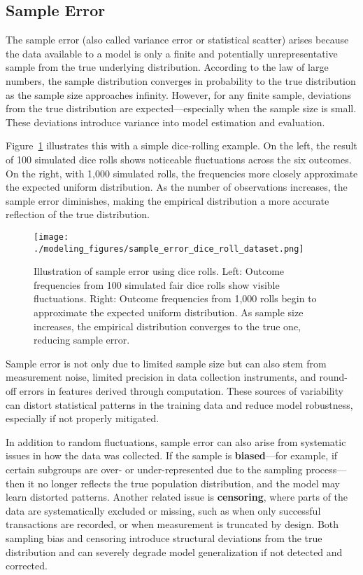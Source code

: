 \documentclass[12pt,openany]{book}
\begin{document}
\subsection{Sample Error}  \label{subsec:sample_error}

The sample error (also called variance error or statistical scatter) arises because the data available to a model is only a finite and potentially unrepresentative sample from the true underlying distribution. According to the law of large numbers, the sample distribution converges in probability to the true distribution as the sample size approaches infinity. However, for any finite sample, deviations from the true distribution are expected—especially when the sample size is small. These deviations introduce variance into model estimation and evaluation. \newline

Figure~\ref{fig:sample-error-dice} illustrates this with a simple dice-rolling example. On the left, the result of 100 simulated dice rolls shows noticeable fluctuations across the six outcomes. On the right, with 1,000 simulated rolls, the frequencies more closely approximate the expected uniform distribution. As the number of observations increases, the sample error diminishes, making the empirical distribution a more accurate reflection of the true distribution. \newline

\begin{figure}[H]
    \centering
    \texttt{[image: ./modeling\_figures/sample\_error\_dice\_roll\_dataset.png]}
    \caption{
    Illustration of sample error using dice rolls. Left: Outcome frequencies from 100 simulated fair dice rolls show visible fluctuations. Right: Outcome frequencies from 1,000 rolls begin to approximate the expected uniform distribution. As sample size increases, the empirical distribution converges to the true one, reducing sample error.
    }
    \label{fig:sample-error-dice}
\end{figure}

Sample error is not only due to limited sample size but can also stem from measurement noise, limited precision in data collection instruments, and round-off errors in features derived through computation. These sources of variability can distort statistical patterns in the training data and reduce model robustness, especially if not properly mitigated. \newline

In addition to random fluctuations, sample error can also arise from systematic issues in how the data was collected. If the sample is \textbf{biased}—for example, if certain subgroups are over- or under-represented due to the sampling process—then it no longer reflects the true population distribution, and the model may learn distorted patterns. Another related issue is \textbf{censoring}, where parts of the data are systematically excluded or missing, such as when only successful transactions are recorded, or when measurement is truncated by design. Both sampling bias and censoring introduce structural deviations from the true distribution and can severely degrade model generalization if not detected and corrected.
\end{document}
